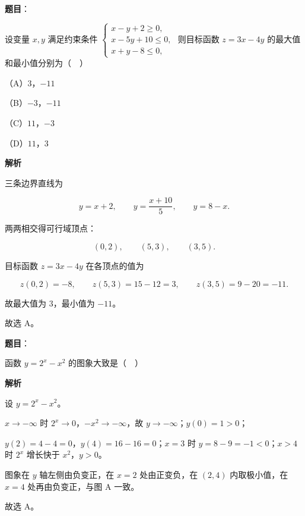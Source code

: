 \begin{answer}

\textbf{题目}：

设变量 $x,y$ 满足约束条件 $\begin{cases}x-y+2\geqslant0,\\ x-5y+10\leqslant0,\\ x+y-8\leqslant0,\end{cases}$ 则目标函数 $z=3x-4y$ 的最大值和最小值分别为（　）

（A）$3$，$-11$

（B）$-3$，$-11$

（C）$11$，$-3$

（D）$11$，$3$

\textbf{解析}

三条边界直线为

\nopagebreak[4]
\[y=x+2,\qquad y=\frac{x+10}{5},\qquad y=8-x.\]

两两相交得可行域顶点：

\nopagebreak[4]
\[(0,2),\qquad (5,3),\qquad (3,5).\]

目标函数 $z=3x-4y$ 在各顶点的值为

\nopagebreak[4]
\[z(0,2)=-8,\qquad z(5,3)=15-12=3,\qquad z(3,5)=9-20=-11.\]

故最大值为 $3$，最小值为 $-11$。

故选 A。


\end{answer}
\begin{answer}

\textbf{题目}：

函数 $y=2^x-x^2$ 的图象大致是（　）
\nopagebreak[4]
\begin{center}\end{center}
\nopagebreak[4]
\textbf{解析}

设 $y=2^x-x^2$。

$x\to-\infty$ 时 $2^x\to0$，$-x^2\to-\infty$，故 $y\to-\infty$；$y(0)=1>0$；

$y(2)=4-4=0$，$y(4)=16-16=0$；$x=3$ 时 $y=8-9=-1<0$；$x>4$ 时 $2^x$ 增长快于 $x^2$，$y>0$。

图象在 $y$ 轴左侧由负变正，在 $x=2$ 处由正变负，在 $(2,4)$ 内取极小值，在 $x=4$ 处再由负变正，与图 A 一致。

故选 A。


\end{answer}
